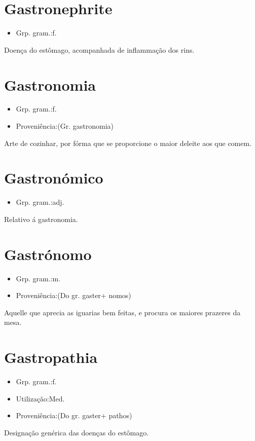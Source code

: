 \section{Gastronephrite}
\begin{itemize}
\item {Grp. gram.:f.}
\end{itemize}
Doença do estômago, acompanhada de inflammação dos rins.
\section{Gastronomia}
\begin{itemize}
\item {Grp. gram.:f.}
\end{itemize}
\begin{itemize}
\item {Proveniência:(Gr. \textunderscore gastronomia\textunderscore )}
\end{itemize}
Arte de cozinhar, por fórma que se proporcione o maior deleite aos que comem.
\section{Gastronómico}
\begin{itemize}
\item {Grp. gram.:adj.}
\end{itemize}
Relativo á gastronomia.
\section{Gastrónomo}
\begin{itemize}
\item {Grp. gram.:m.}
\end{itemize}
\begin{itemize}
\item {Proveniência:(Do gr. \textunderscore gaster\textunderscore  + \textunderscore nomos\textunderscore )}
\end{itemize}
Aquelle que aprecia as iguarias bem feitas, e procura os maiores prazeres da mesa.
\section{Gastropathia}
\begin{itemize}
\item {Grp. gram.:f.}
\end{itemize}
\begin{itemize}
\item {Utilização:Med.}
\end{itemize}
\begin{itemize}
\item {Proveniência:(Do gr. \textunderscore gaster\textunderscore  + \textunderscore pathos\textunderscore )}
\end{itemize}
Designação genérica das doenças do estômago.

